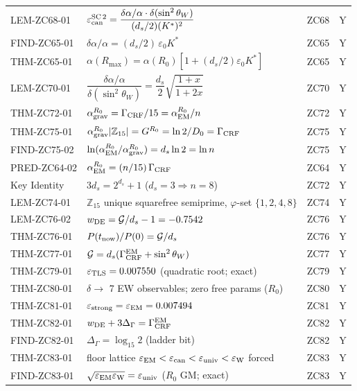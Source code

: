 \documentclass[11pt, a4paper]{article}
\newcommand{\swsq}{\sin^2\theta_W}
\newcommand{\Ztf}{\mathbb{Z}_{15}}
\newcommand{\Kstar}{K^*}
\begin{document}
{\begin{longtable}{p{2.7cm} p{7.6cm} p{2.0cm} c}
LEM-ZC68-01 & $\varepsilon_{\rm can}^{\rm SC\,2} = \dfrac{\delta\alpha/\alpha\cdot\delta(\swsq)}{(d_s/2)(\Kstar)^2}$ & ZC68 & Y \\
FIND-ZC65-01 & $\delta\alpha/\alpha = (d_s/2)\,\varepsilon_0\Kstar$ & ZC65 & Y \\
THM-ZC65-01 & $\alpha(R_{\max}) = \alpha(R_0)[1+(d_s/2)\varepsilon_0\Kstar]$ & ZC65 & Y \\
LEM-ZC70-01 & $\dfrac{\delta\alpha/\alpha}{\delta(\swsq)} = \dfrac{d_s}{2}\sqrt{\dfrac{1+x}{1+2x}}$ & ZC70 & Y \\
THM-ZC72-01 & $\alpha_{\rm grav}^{R_0} = \Gamma_{\rm CRF}/15 = \alpha_{\rm EM}^{R_0}/n$ & ZC72 & Y \\
THM-ZC75-01 & $\alpha_{\rm grav}^{R_0}|\Ztf| = G^{R_0} = \ln 2/D_0 = \Gamma_{\rm CRF}$ & ZC75 & Y \\
FIND-ZC75-02 & $\ln(\alpha_{\rm EM}^{R_0}/\alpha_{\rm grav}^{R_0}) = d_s\ln 2 = \ln n$ & ZC75 & Y \\
PRED-ZC64-02 & $\alpha_{\rm EM}^{R_0} = (n/15)\,\Gamma_{\rm CRF}$ & ZC64 & Y \\
Key Identity & $3d_s = 2^{d_s}+1$ ($d_s{=}3\Rightarrow n{=}8$) & ZC72 & Y \\
LEM-ZC74-01 & $\Ztf$ unique squarefree semiprime, $\varphi$-set $\{1,2,4,8\}$ & ZC74 & Y \\
LEM-ZC76-02 & $w_{\rm DE} = \mathcal{G}/d_s - 1 = -0.7542$ & ZC76 & Y \\
THM-ZC76-01 & $P(t_{\rm now})/P(0) = \mathcal{G}/d_s$ & ZC76 & Y \\
THM-ZC77-01 & $\mathcal{G} = d_s(\Gamma_{\rm CRF}^{\rm EM} + \sin^2\theta_W)$ & ZC77 & Y \\
THM-ZC79-01 & $\varepsilon_{\rm TLS} = 0.007550$ (quadratic root; exact) & ZC79 & Y \\
THM-ZC80-01 & $\delta\to$ 7 EW observables; zero free params ($R_0$) & ZC80 & Y \\
THM-ZC81-01 & $\varepsilon_{\rm strong} = \varepsilon_{\rm EM} = 0.007494$ & ZC81 & Y \\
THM-ZC82-01 & $w_{\rm DE} + 3\Delta_\Gamma = \Gamma_{\rm CRF}^{\rm EM}$ & ZC82 & Y \\
FIND-ZC82-01 & $\Delta_\Gamma = \log_{15}2$ (ladder bit) & ZC82 & Y \\
THM-ZC83-01 & floor lattice $\varepsilon_{\rm EM}<\varepsilon_{\rm can}<\varepsilon_{\rm univ}<\varepsilon_{\rm W}$ forced & ZC83 & Y \\
FIND-ZC83-01 & $\sqrt{\varepsilon_{\rm EM}\varepsilon_{\rm W}}=\varepsilon_{\rm univ}$ ($R_0$ GM; exact) & ZC83 & Y \\

\end{longtable}}
\end{document}
